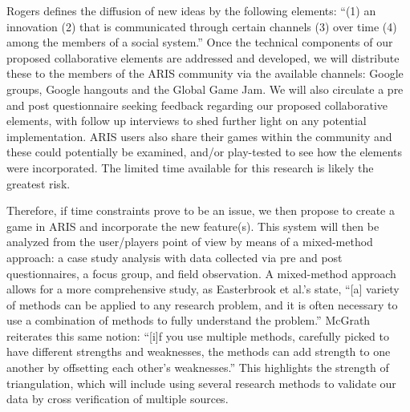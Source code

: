 \documentclass{sigchi}
\begin{document}
Rogers defines the diffusion of new ideas by the following elements: ``(1) an innovation (2) that is communicated through certain channels (3) over time (4) among the members of a social system.''\cite{rogers2003diffusion} Once the technical components of our proposed collaborative elements are addressed and developed, we will distribute these to the members of the ARIS community via the available channels:  Google groups, Google hangouts and the Global Game Jam. We will also circulate a pre and post questionnaire seeking feedback regarding our proposed collaborative elements, with follow up interviews to shed further light on any potential implementation. ARIS users also share their games within the community and these could potentially be examined, and/or play-tested to see how the elements were incorporated. The limited time available for this research is likely the greatest risk.

Therefore, if time constraints prove to be an issue, we then propose to create a game in ARIS and incorporate the new feature(s). This system will then be analyzed from the user/players point of view by means of a mixed-method approach: a case study analysis with data collected via pre and post questionnaires, a focus group, and field observation. A mixed-method approach allows for a more comprehensive study, as Easterbrook et al.’s state, ``[a] variety of methods can be applied to any research problem, and it is often necessary to use a combination of methods to fully understand the problem.''\cite{easterbrook2008selecting} McGrath reiterates this same notion: ``[i]f you use multiple methods, carefully picked to have different strengths and weaknesses, the methods can add strength to one another by offsetting each other’s weaknesses.''\cite{mcgrath1995methodology} This highlights the strength of triangulation, which will include using several research methods to validate our data by cross verification of multiple sources.
\end{document}
